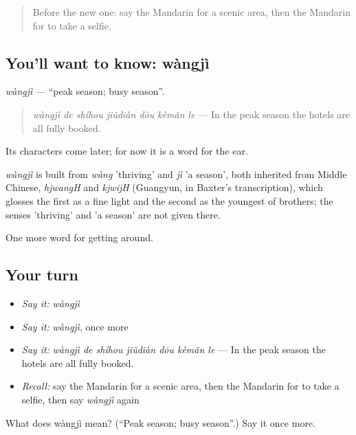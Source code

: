 \label{lesson:ZH-C430-wangji}



\begin{quote}
Before the new one: say the Mandarin for a scenic area, then the Mandarin for to take a selfie.
\end{quote}

\subsection*{You'll want to know: wàngjì}
\emph{wàngjì} — \textquotedblleft{}peak season; busy season\textquotedblright{}.

\begin{quote}
\emph{wàngjì de shíhou jiǔdiàn dōu kèmǎn le} — In the peak season the hotels are all fully booked.
\end{quote}

Its characters come later; for now it is a word for the ear.

\begin{cousinweb}
\emph{wàngjì} is built from \emph{wàng} 'thriving' and \emph{jì} 'a season', both inherited from Middle Chinese, \emph{hjwangH} and \emph{kjwijH} (Guangyun, in Baxter's transcription), which glosses the first as a fine light and the second as the youngest of brothers; the senses 'thriving' and 'a season' are not given there.
\end{cousinweb}

\begin{grammarlens}[title={What you've built}]
One more word for getting around.
\end{grammarlens}

\subsection*{Your turn}
\begin{itemize}
\raggedright
  \item \emph{Say it:} \emph{wàngjì}
  \item \emph{Say it:} \emph{wàngjì}, once more
  \item \emph{Say it:} \emph{wàngjì de shíhou jiǔdiàn dōu kèmǎn le} — In the peak season the hotels are all fully booked.
  \item \emph{Recall:} say the Mandarin for a scenic area, then the Mandarin for to take a selfie, then say \emph{wàngjì} again
\end{itemize}

\begin{tcolorbox}[breakable,colback=teal!4,colframe=teal!35!black,title={Before you move on}]
What does wàngjì mean? (\textquotedblleft{}Peak season; busy season\textquotedblright{}.) Say it once more.
\end{tcolorbox}
